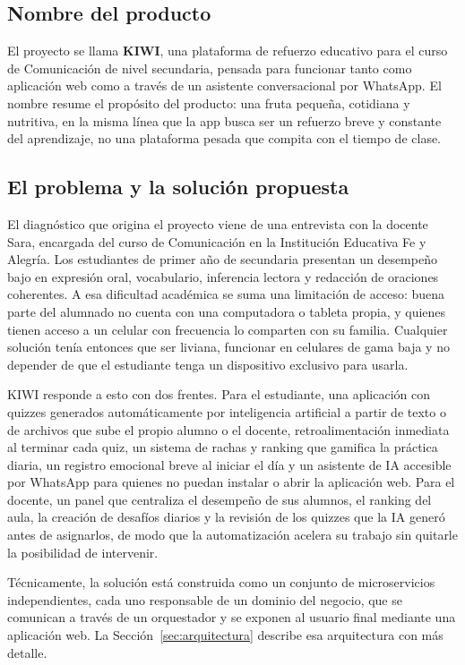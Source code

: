 \documentclass[12pt,a4paper]{article}
\begin{document}
\subsection{Nombre del producto}

El proyecto se llama \textbf{KIWI}, una plataforma de refuerzo educativo para el curso de
Comunicación de nivel secundaria, pensada para funcionar tanto como aplicación web como a través
de un asistente conversacional por WhatsApp. El nombre resume el propósito del producto: una
fruta pequeña, cotidiana y nutritiva, en la misma línea que la app busca ser un refuerzo breve y
constante del aprendizaje, no una plataforma pesada que compita con el tiempo de clase.

\subsection{El problema y la solución propuesta}

El diagnóstico que origina el proyecto viene de una entrevista con la docente Sara, encargada del
curso de Comunicación en la Institución Educativa Fe y Alegría. Los estudiantes de primer año de
secundaria presentan un desempeño bajo en expresión oral, vocabulario, inferencia lectora y
redacción de oraciones coherentes. A esa dificultad académica se suma una limitación de acceso:
buena parte del alumnado no cuenta con una computadora o tableta propia, y quienes tienen acceso a
un celular con frecuencia lo comparten con su familia. Cualquier solución tenía entonces que ser
liviana, funcionar en celulares de gama baja y no depender de que el estudiante tenga un
dispositivo exclusivo para usarla.

KIWI responde a esto con dos frentes. Para el estudiante, una aplicación con quizzes generados
automáticamente por inteligencia artificial a partir de texto o de archivos que sube el propio
alumno o el docente, retroalimentación inmediata al terminar cada quiz, un sistema de rachas y
ranking que gamifica la práctica diaria, un registro emocional breve al iniciar el día y un
asistente de IA accesible por WhatsApp para quienes no puedan instalar o abrir la aplicación web.
Para el docente, un panel que centraliza el desempeño de sus alumnos, el ranking del aula, la
creación de desafíos diarios y la revisión de los quizzes que la IA generó antes de asignarlos,
de modo que la automatización acelera su trabajo sin quitarle la posibilidad de intervenir.

Técnicamente, la solución está construida como un conjunto de microservicios independientes,
cada uno responsable de un dominio del negocio, que se comunican a través de un orquestador y se
exponen al usuario final mediante una aplicación web. La Sección~\ref{sec:arquitectura} describe
esa arquitectura con más detalle.
\end{document}
